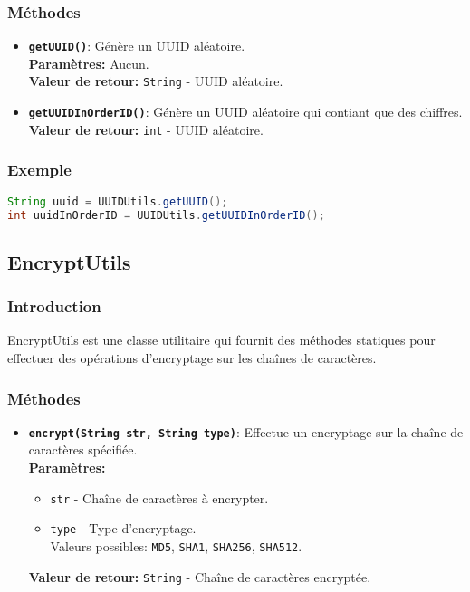 \documentclass{article}
\begin{document}
\subsubsection{Méthodes}
\begin{itemize}
  \item \textbf{\texttt{getUUID()}}: Génère un UUID aléatoire.\\
  \textbf{Paramètres:} Aucun.\\
  \textbf{Valeur de retour:} \texttt{String} - UUID aléatoire.
  \item \textbf{\texttt{getUUIDInOrderID()}}: Génère un UUID aléatoire qui contiant que des chiffres.\\
  \textbf{Valeur de retour:} \texttt{int} - UUID aléatoire.
\end{itemize}
\subsubsection{Exemple}
\begin{lstlisting}[language=Java]
String uuid = UUIDUtils.getUUID();
int uuidInOrderID = UUIDUtils.getUUIDInOrderID();
\end{lstlisting}
\subsection{EncryptUtils}
\subsubsection{Introduction}
EncryptUtils est une classe utilitaire qui fournit des méthodes statiques pour effectuer des opérations d'encryptage sur les chaînes de caractères.
\subsubsection{Méthodes}
\begin{itemize}
  \item \textbf{\texttt{encrypt(String str, String type)}}: Effectue un encryptage sur la chaîne de caractères spécifiée.\\
  \textbf{Paramètres:}
  \begin{itemize}
    \item \texttt{str} - Chaîne de caractères à encrypter.
    \item \texttt{type} - Type d'encryptage.\\
    Valeurs possibles: \texttt{MD5}, \texttt{SHA1}, \texttt{SHA256}, \texttt{SHA512}.
  \end{itemize}
  \textbf{Valeur de retour:} \texttt{String} - Chaîne de caractères encryptée.
\end{itemize}
\end{document}

